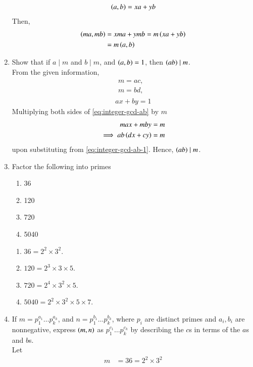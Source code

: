 \begin{enumerate}[label=\arabic*.,ref=\thesubsection.\theenumi]
\begin{align}
			\left(a,b\right) = xa+yb
		\end{align}
		Then, 
		\begin{align}
			\left(ma,mb\right) &= xma + ymb = m\left(xa+yb\right)
			\\
			&= m \left(a,b\right)
		\end{align}
	\item Show that if $a \mid m$ and $b \mid m$, and $\left(a,b\right) = 1$, then $\left(ab\right) \mid m$.
		\\
		\solution From the given information, 
		\begin{align}
			\label{eq:integer-gcd-ab-1}
			\begin{split}
			m = ac, 
			\\
			m = bd, 
			\end{split}
			\\
			ax+by = 1
			\label{eq:integer-gcd-ab}
		\end{align}
		Multiplying both sides of 
			\eqref{eq:integer-gcd-ab}
			by $m$
		\begin{align}
			max+mby &= m
			\\
			\implies ab\left(dx+cy\right) &=m
		\end{align}
		upon substituting from 
			\eqref{eq:integer-gcd-ab-1}.  Hence, $\left(ab\right)\mid m$.
		\item Factor the following into primes
\begin{enumerate}
	\item 36
	\item 120
	\item 720
	\item 5040
\end{enumerate}
\solution 
\begin{enumerate}
\item $36 = 2^2\times 3^2$.
\item $120 = 2^3\times 3 \times 5$.
\item $720 = 2^4\times 3^2 \times 5$.
\item $5040 = 2^2\times 3^2 \times 5 \times 7$.
\end{enumerate}
\item If $m = p_{1}^{a_1} \dots p_{k}^{a_k}$, and 
$n = p_{1}^{b_1} \dots p_{k}^{b_k}$, where $p_i$ are distinct primes and $a_i, b_i$ are nonnegative, express
$\left(m,n\right)$ as $ p_{1}^{c_1} \dots p_{k}^{c_k}$ by describing the $c$s in terms of the $a$s and $b$s.
\label{prob:integer-gcd-primefac}
\\
\solution Let 
\begin{align}
	m &= 36 = 2^2\times 3^2

\end{align}
\end{enumerate}
